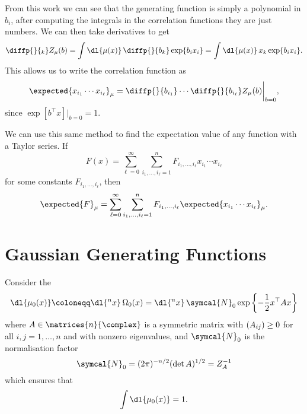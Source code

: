 \documentclass[fleqn]{NotesClass}
\let\Re\relax
\DeclareMathOperator{\Re}{Re}
\newcommand{\trans}{{\top}}
\begin{document}
    From this work we can see that the generating function is simply a polynomial in \(b_i\), after computing the integrals in the correlation functions they are just numbers.
    We can then take derivatives to get
    \begin{equation}
        \diffp{}{_k} Z_\mu(b) = \int \dl{\mu(x)} \, \diffp{}{b_k} \exp\{b_ix_i\} = \int \dl{\mu(x)} \, x_k \exp\{b_ix_i\}.
    \end{equation}
    This allows us to write the correlation function as
    \begin{equation}
        \expected{x_{i_1} \dotsm x_{i_\ell}}_\mu = \diffp{}{b_{i_1}} \dotsm \diffp{}{b_{i_\ell}} Z_\mu(b) \bigg|_{b = 0},
    \end{equation}
    since \(\exp[b^\trans x]|_{b = 0} = 1\).
    
    We can use this same method to find the expectation value of any function with a Taylor series.
    If
    \begin{equation}\label{eqn:taylor series}
        F(x) = \sum_{\ell = 0}^{\infty} \sum_{i_1, \dotsc, i_{\ell} = 1}^{n} F_{i_1, \dotsc, i_{\ell}} x_{i_1} \dotsm x_{i_\ell}
    \end{equation}
    for some constants \(F_{i_1, \dotsc, i_{\ell}}\), then
    \begin{equation}
        \expected{F}_\mu = \sum_{\ell = 0}^{\infty} \sum_{i_1, \dotsc, i_{\ell} = 1}^{n} F_{i_1, \dotsc, i_{\ell}} \expected{x_{i_1} \dotsm x_{i_\ell}}_\mu.
    \end{equation}
    
    \section{Gaussian Generating Functions}
    Consider the 
    \begin{equation}
        \dl{\mu_0(x)} \coloneqq \dl{^nx} \, \Omega_0(x) = \dl{^n x} \, \symcal{N}_0 \exp\left\{ -\frac{1}{2} x^\trans A x \right\}
    \end{equation}
    where \(A \in \matrices{n}{\complex}\) is a symmetric matrix with \(\Re(A_{ij}) \ge 0\) for all \(i, j = 1, \dotsc, n\) and with nonzero eigenvalues, and \(\symcal{N}_0\) is the normalisation factor
    \begin{equation}
        \symcal{N}_0 = (2\pi)^{-n/2} (\det A)^{1/2} = Z_A^{-1}
    \end{equation}
    which ensures that
    \begin{equation}
        \int \dl{\mu_0(x)} = 1.
    \end{equation}
    
\end{document}
